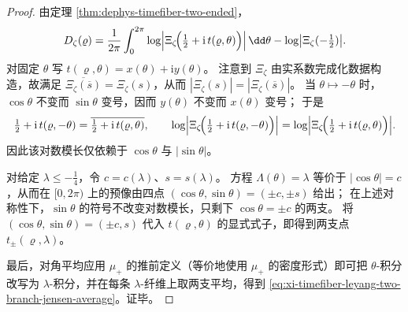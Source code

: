 \begin{proof}
由定理 \ref{thm:dephys-timefiber-two-ended}，
\[
D_{\zeta}(\varrho)
=\frac{1}{2\pi}\int_{0}^{2\pi}\log\Bigl|\Xi_{\zeta}\!\Bigl(\tfrac12+\mathrm{i}\,t(\varrho,\theta)\Bigr)\Bigr|\,\dd\theta
-\log\bigl|\Xi_{\zeta}(-\tfrac12)\bigr|.
\]
对固定 \(\theta\) 写 \(t(\varrho,\theta)=x(\theta)+\mathrm{i}y(\theta)\)。
注意到 \(\Xi_{\zeta}\) 由实系数完成化数据构造，故满足
\(
\overline{\Xi_{\zeta}(\overline{s})}=\Xi_{\zeta}(s)
\)，从而 \(|\Xi_{\zeta}(s)|=|\Xi_{\zeta}(\overline{s})|\)。
当 \(\theta\mapsto-\theta\) 时，\(\cos\theta\) 不变而 \(\sin\theta\) 变号，因而 \(y(\theta)\) 不变而 \(x(\theta)\) 变号；
于是
\[
\tfrac12+\mathrm{i}\,t(\varrho,-\theta)
=\overline{\tfrac12+\mathrm{i}\,t(\varrho,\theta)},
\qquad
\log\Bigl|\Xi_{\zeta}\!\Bigl(\tfrac12+\mathrm{i}\,t(\varrho,-\theta)\Bigr)\Bigr|
=\log\Bigl|\Xi_{\zeta}\!\Bigl(\tfrac12+\mathrm{i}\,t(\varrho,\theta)\Bigr)\Bigr|.
\]
因此该对数模长仅依赖于 \(\cos\theta\) 与 \(|\sin\theta|\)。
\par
对给定 \(\lambda\le -\tfrac14\)，令 \(c=c(\lambda)\)、\(s=s(\lambda)\)。
方程 \(\Lambda(\theta)=\lambda\) 等价于 \(|\cos\theta|=c\)，从而在 \([0,2\pi)\) 上的预像由四点 \((\cos\theta,\sin\theta)=(\pm c,\pm s)\) 给出；
在上述对称性下，\(\sin\theta\) 的符号不改变对数模长，只剩下 \(\cos\theta=\pm c\) 的两支。
将 \((\cos\theta,\sin\theta)=(\pm c,s)\) 代入 \(t(\varrho,\theta)\) 的显式式子，即得到两支点 \(t_{\pm}(\varrho,\lambda)\)。
\par
最后，对角平均应用 \(\mu_{+}\) 的推前定义（等价地使用 \(\mu_{+}\) 的密度形式）即可把 \(\theta\)-积分改写为 \(\lambda\)-积分，并在每条 \(\lambda\)-纤维上取两支平均，得到 \eqref{eq:xi-timefiber-leyang-two-branch-jensen-average}。证毕。
\end{proof}

